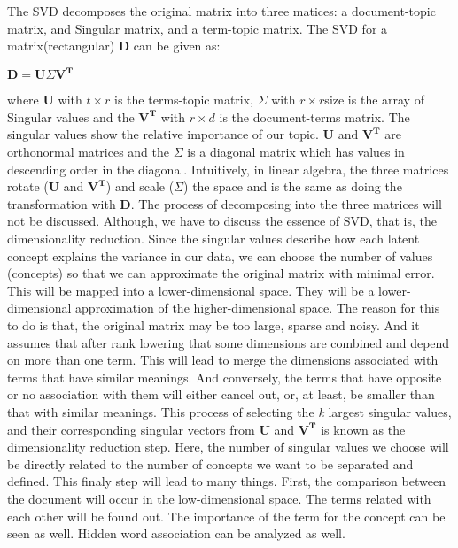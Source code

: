 \documentclass[12pt]{article}
\begin{document}
        The SVD decomposes the original matrix into three matices: a document-topic matrix, and Singular matrix, and a term-topic matrix. 
        The SVD for a matrix(rectangular) \textbf{D} can be given as:
        \begin{center}
            ${\mathbf{D} = \mathbf{U} \Sigma  \mathbf{V^T}}$
        \end{center}
        where \textbf{U} with ${t \times r}$ is the terms-topic matrix, ${\Sigma}$ with ${r \times r}$size is the array of Singular values and 
        the ${\mathbf{V^T}}$ with ${r \times d}$ is the document-terms matrix. 
        The singular values show the relative importance of our topic. \textbf{U} and ${\mathbf{V^T}}$ are orthonormal matrices and the ${\Sigma}$ is a diagonal matrix which has values 
        in descending order in the diagonal.
        Intuitively, in linear algebra, the three matrices rotate (\textbf{U} and ${\mathbf{V^T}}$) and scale (${\Sigma}$) the space and is the same as doing 
        the transformation with \textbf{D}. 
        The process of decomposing into the three matrices will not be discussed. Although, we have to discuss the essence of SVD, that is, the dimensionality reduction. 
        Since the singular values describe how each latent concept explains the variance in our data, we can choose the number of values (concepts) so that we can approximate the 
        original matrix with minimal error. This will be mapped into a lower-dimensional space. They will be a lower-dimensional approximation of the higher-dimensional space. 
        The reason for this to do is that, the original matrix may be too large, sparse and noisy. And it assumes that after rank lowering that some dimensions are combined and
        depend on more than one term. This will lead to merge the dimensions associated with terms that have similar meanings. And conversely, the terms that have opposite or no 
        association with them will either cancel out, or, at least, be smaller than that with similar meanings.
        This process of selecting the \emph{k} largest singular values, and their corresponding singular vectors from \textbf{U} and ${\mathbf{V^T}}$ is known as the dimensionality reduction step. 
        Here, the number of singular values we choose will be directly related to the number of concepts we want to be separated and defined.
        This finaly step will lead to many things. First, the comparison between the document will occur in the low-dimensional space. The terms related with each other will be found out. 
        The importance of the term for the concept can be seen as well. Hidden word association can be analyzed as well.   
\end{document}
